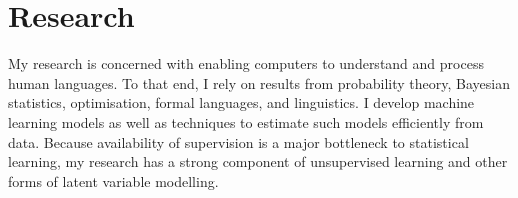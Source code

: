 \section*{Research}

My research is concerned with enabling computers to understand and process human languages. 
To that end, I rely on results from probability theory, Bayesian statistics, optimisation, formal languages, and linguistics. I develop machine learning models as well as techniques to estimate such models efficiently from data. Because availability of supervision is a major bottleneck to statistical learning, my research has a strong component of unsupervised learning and other forms of latent variable modelling. 
